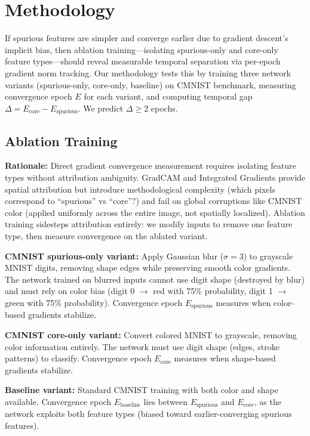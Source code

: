 \section{Methodology}

If spurious features are simpler and converge earlier due to gradient descent's implicit bias, then ablation training---isolating spurious-only and core-only feature types---should reveal measurable temporal separation via per-epoch gradient norm tracking. Our methodology tests this by training three network variants (spurious-only, core-only, baseline) on CMNIST benchmark, measuring convergence epoch $E$ for each variant, and computing temporal gap $\Delta = E_{\text{core}} - E_{\text{spurious}}$. We predict $\Delta \geq 2$ epochs.

\subsection{Ablation Training}

\textbf{Rationale:} Direct gradient convergence measurement requires isolating feature types without attribution ambiguity. GradCAM and Integrated Gradients provide spatial attribution but introduce methodological complexity (which pixels correspond to ``spurious'' vs ``core''?) and fail on global corruptions like CMNIST color (applied uniformly across the entire image, not spatially localized). Ablation training sidesteps attribution entirely: we modify inputs to remove one feature type, then measure convergence on the ablated variant.

\textbf{CMNIST spurious-only variant:} Apply Gaussian blur ($\sigma=3$) to grayscale MNIST digits, removing shape edges while preserving smooth color gradients. The network trained on blurred inputs cannot use digit shape (destroyed by blur) and must rely on color bias (digit 0 $\rightarrow$ red with 75\% probability, digit 1 $\rightarrow$ green with 75\% probability). Convergence epoch $E_{\text{spurious}}$ measures when color-based gradients stabilize.

\textbf{CMNIST core-only variant:} Convert colored MNIST to grayscale, removing color information entirely. The network must use digit shape (edges, stroke patterns) to classify. Convergence epoch $E_{\text{core}}$ measures when shape-based gradients stabilize.

\textbf{Baseline variant:} Standard CMNIST training with both color and shape available. Convergence epoch $E_{\text{baseline}}$ lies between $E_{\text{spurious}}$ and $E_{\text{core}}$, as the network exploits both feature types (biased toward earlier-converging spurious features).

